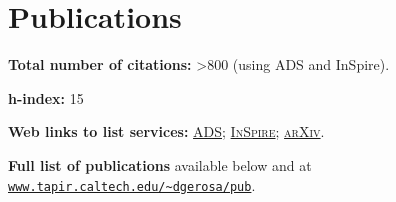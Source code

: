 \documentclass[letterpaper]{moderncv}
\begin{document}
\section{Publications}

\textbf{Total number of citations:}  {>800}  (using ADS and InSpire).

\textbf{h-index:} 15


\textbf{Web links to list services:}
\href{http://labs.adsabs.harvard.edu/adsabs/search/?q=author%3A%22Gerosa%2C+Davide%22&month_from=&year_from=&month_to=&year_to=&db_f=&nr=&article=1&bigquery=&re_sort_type=CITED&re_sort_dir=desc}{\textsc{ADS}};
\href{http://inspirehep.net/search?ln=en&ln=en&p=exactauthor%3AD.Gerosa.1&of=hb&action_search=Search&sf=&so=d&rm=citation&rg=25&sc=0}{\textsc{InSpire}};
\href{http://arxiv.org/a/gerosa_d_1.html}{\textsc{arXiv}}.

\textbf{Full list of publications} available below and at \href{http://www.tapir.caltech.edu/~dgerosa/pub}{\texttt{www.tapir.caltech.edu/\textasciitilde dgerosa/pub}}.






\vspace{+0.2cm}
\cvitem{\textcolor{color1}{Selected publications}}{}
\vspace{-0.7cm}
\end{document}
